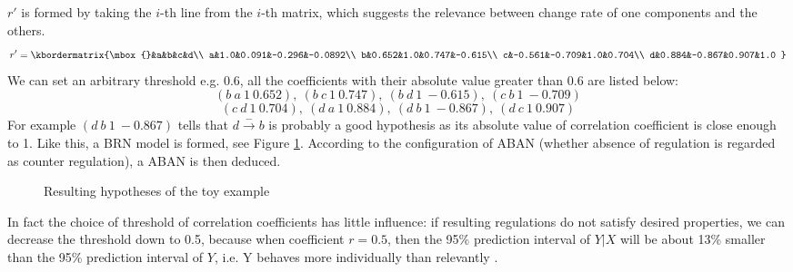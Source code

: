  $r'$ is formed by taking the $i$-th line from the $i$-th matrix, which suggests the relevance between change rate of one components and the others.
$$r'=\kbordermatrix{\mbox{}&a&b&c&d\\
a&1.0&0.091&-0.296&-0.0892\\
b&0.652&1.0&0.747&-0.615\\
c&-0.561&-0.709&1.0&0.704\\
d&0.884&-0.867&0.907&1.0
}$$
We can set an arbitrary threshold e.g. 0.6, all the coefficients with their absolute value greater than 0.6 are listed below:
$$(b\ a\ 1\ 0.652),\ (b\ c\ 1\ 0.747),\ (b\ d\ 1\ -0.615),\ (c\ b\ 1\ -0.709)$$
$$(c\ d\ 1\ 0.704),\ (d\ a\ 1\ 0.884),\ (d\ b\ 1\ -0.867),\ (d\ c\ 1\ 0.907)$$
For example $(d\ b\ 1\ -0.867)$ tells that $d\xrightarrow{-}b$ is probably a good hypothesis as its absolute value of correlation coefficient is close enough to 1. Like this, a BRN model is formed, see Figure \ref{ResultBRN}. According to the configuration of ABAN (whether absence of regulation is regarded as counter regulation), a ABAN is then deduced.

\begin{figure}[ht]
\centering
{}

\caption{Resulting hypotheses of the toy example}\label{ResultBRN}
\end{figure}
In fact the choice of threshold of correlation coefficients has little influence: if resulting regulations do not satisfy desired properties, we can decrease the threshold down to 0.5, because when coefficient $r =0.5$, then the 95\% prediction interval of $Y|X$ will be about 13\% smaller than the 95\% prediction interval of $Y$, i.e. Y behaves more individually than relevantly \cite{hull1927correlation}.

